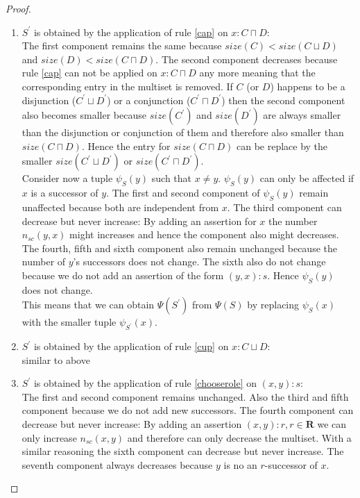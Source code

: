 \documentclass[a4paper,11pt]{scrartcl}
\theoremstyle{break}
\theoremstyle{definition}
\begin{document}
\begin{proof}$ $\\
\vspace*{-5mm}
\begin{enumerate}
\item $S^\prime$ is obtained by the application of rule \ref{cap} on $x:C\sqcap D$:\\
The first component remains the same because $size(C)<size(C\sqcup D)$ and $size(D)<size(C\sqcap D)$. The second component decreases because rule \ref{cap} can not be applied on $x:C\sqcap D$ any more meaning that the corresponding entry in the multiset is removed. If $C$ (or $D$) happens to be a disjunction ($C^\prime\sqcup D^\prime$) or a conjunction ($C^\prime\sqcap D^\prime$) then the second component also becomes smaller because $size(C^\prime)$ and $size(D^\prime)$ are always smaller than the disjunction or conjunction of them and therefore also smaller than $size(C\sqcap D)$. Hence the entry for $size(C\sqcap D)$ can be replace by the smaller $size(C^\prime\sqcup D^\prime)$ or $size(C^\prime\sqcap D^\prime)$.\\
Consider now a tuple $\psi_S(y)$ such that $x\neq y$. $\psi_S(y)$ can only be affected if $x$ is a successor of $y$. The first and second component of $\psi_S(y)$ remain unaffected because both are independent from $x$. The third component can decrease but never increase: By adding an assertion for $x$ the number $n_{sc}(y,x)$ might increases and hence the component also might decreases. The fourth, fifth and sixth component also remain unchanged because the number of $y$'s successors does not change. The sixth also do not change because we do not add an assertion of the form $(y,x):s$. Hence $\psi_S(y)$ does not change.\\
This means that we can obtain $\Psi(S^\prime)$ from $\Psi(S)$ by replacing $\psi_S(x)$ with the smaller tuple $\psi_{S^\prime}(x)$. 
\item $S^\prime$ is obtained by the application of rule \ref{cup} on $x:C\sqcup D$:\\
similar to above
\item $S^\prime$ is obtained by the application of rule \ref{chooserole} on $(x,y):s$:\\
The first and second component remains unchanged. Also the third and fifth component because we do not add new successors. The fourth component can decrease but never increase: By adding an assertion $(x,y):r, r\in\mathbf{R}$ we can only increase $n_{sc}(x,y)$ and therefore can only decrease the multiset. With a similar reasoning the sixth component can decrease but never increase. The seventh component always decreases because $y$ is no an $r$-successor of $x$.\\

\end{enumerate}
\end{proof}
\end{document}
